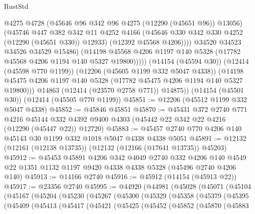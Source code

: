 \begin{lexlean}{RustStd}
\begin{coremodule}
{\begin{coremodule}
{{{{{{{{{{{{{{{{{{{{{{{{{{{{{{{{{{{{{{{{{{{{{{{{{{                      @4275
                      @4728
                      (@45646 @96 @342 @96 @4275 (@12290 (@45651 @96)) @13056)
                      (@45746
                        @447
                        @382
                        @342
                        @11
                        @4252
                        @4166
                        (@45646 @330 @342 @330 @4252 (@12290 (@45651 @330)) @12933)
                        (@12392 @45568 @4206))))
                  @34520
                  @34523
                  @34526
                  @34529
                  @15486)
                (@14198
                  @45568
                  @4206
                  @1197
                  @140
                  @5328
                  (@17782 @45568 @4206 @1194 @140 @5327 @19800)))))
          (@14154 (@45594 @30))
          (@12414 (@45598 @770 @1199))
          (@12206 (@45605 @1199 @332 @5047 @4338))
          (@14198 @45475 @4206 @1197 @140 @5328 (@17782 @45475 @4206 @1194 @140 @5327 @19800)))
        @14863
        (@12414 (@23570 @2758 @771))
        @14875))
    (@14154 (@45501 @30))
    (@12414 (@45505 @770 @1199))
@45851 := @12206 (@45512 @1199 @332 @5047 @4338)
@45852 := @45846 @45851
@45870 := @45431
    @372
    @2740
    @771
    @4216
    @45144
    @332
    @4392
    @9400
    @4303
    (@45442 @22 @342 @22 @4216 (@12290 (@45447 @22)) @12720)
@45883 := @45457 @2740 @770 @4206 @140 @45143 @30 @1199 @332 @1018 @5047 @4338 @4338 @5051
@45891 := @12132 (@12161 (@12138 @13735)) (@12132 (@12166 (@17641 @13735)) @45203)
@45912 := @45453
    @45891
    @4206
    @342
    @4049
    @2740
    @332
    @4206
    @140
    @4549
    @22
    @1351
    @1132
    @1197
    @9420
    @4338
    @4338
    @5328
    (@45496 @2740 @4206 @140)
@45913 := @14166 @2740
@45916 := @45912 (@14154 (@45913 @22))
@45917 := @23356 @2740
@45995 := @44920
    (@44981
      (@45028
        (@45071
          (@45104
            (@45167
              (@45204
                (@45230
                  (@45267
                    (@45300
                      (@45329
                        (@45358
                          (@45379
                            (@45395
                              (@45409
                                (@45413
                                  (@45417
                                    (@45421
                                      (@45425
                                        (@45452
                                          (@45852
                                            (@45870
                                              (@45883
}}}}}}}}}}}}}}}}}}}}}}}}}}}}}}}}}}}}}}}}}}}}}}}}}}
\end{coremodule}}
\end{coremodule}
\end{lexlean}
